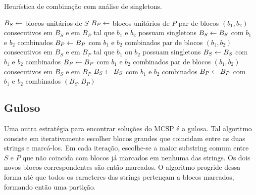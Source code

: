         \begin{algorithm}
        \caption{Heurística de combinação com análise de singletons.} \label{alg:combineS}
        \begin{codebox}
        \li $B_S \leftarrow$ blocos unitários de $S$
        \li $B_P \leftarrow$ blocos unitários de $P$
        \li \Para \Cada par de blocos $(b_1, b_2)$ consecutivos em $B_S$ e em $B_P$
        \zi tal que $b_1$ e $b_2$ possuam singletons \Faca
            \Do
        \li     $B_S \leftarrow B_S$ com $b_1$ e $b_2$ combinados
        \li     $B_P \leftarrow B_P$ com $b_1$ e $b_2$ combinados
            \End
        \li \Para \Cada par de blocos $(b_1, b_2)$ consecutivos em $B_S$ e em $B_P$
        \zi tal que $b_1$ ou $b_2$ possuam singletons \Faca
            \Do
        \li     $B_S \leftarrow B_S$ com $b_1$ e $b_2$ combinados
        \li     $B_P \leftarrow B_P$ com $b_1$ e $b_2$ combinados
            \End
        \li \Para \Cada par de blocos $(b_1, b_2)$ consecutivos em $B_S$ e em $B_P$ \Faca
            \Do
        \li     $B_S \leftarrow B_S$ com $b_1$ e $b_2$ combinados
        \li     $B_P \leftarrow B_P$ com $b_1$ e $b_2$ combinados
            \End
        \li \Devolva $(B_S, B_P)$
        \end{codebox}
    \end{algorithm}

\subsection{Guloso}

    Uma outra estratégia para encontrar soluções do MCSP é a gulosa. Tal algoritmo consiste em iterativamente escolher blocos grandes que coincidam entre as duas strings e marcá-los. Em cada iteração, escolhe-se a maior substring comum entre $S$ e $P$ que não coincida com blocos já marcados em nenhuma das strings. Os dois novos blocos correspondentes são então marcados. O algoritmo progride dessa forma até que todos os caracteres das strings pertençam a blocos marcados, formando então uma partição.

